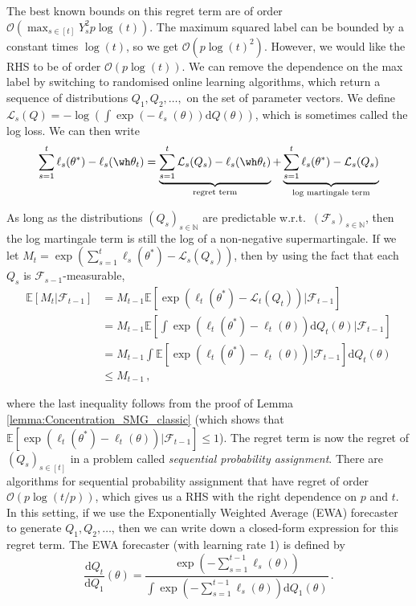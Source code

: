 The best known bounds on this regret term are of order $\mathcal{O}(\max_{s \in [t]}Y_s^2 p\log(t))$. The maximum squared label can be bounded by a constant times $\log(t)$, so we get $\mathcal{O}(p\log(t)^2)$. However, we would like the RHS to be of order $\mathcal{O}(p\log(t))$. We can remove the dependence on the max label by switching to randomised online learning algorithms, which return a sequence of distributions $Q_1, Q_2, \dots, $ on the set of parameter vectors. We define $\mathcal{L}_s(Q) = -\log(\int\exp(-\ell_s(\theta))\mathrm{d}Q(\theta))$, which is sometimes called the log loss. We can then write
\begin{equation}
\sum_{s=1}^t\ell_s(\theta^*)-\ell_s(\wh \theta_t) = \underbrace{\sum_{s=1}^t \mathcal{L}_s(Q_s)-\ell_s(\wh \theta_t) }_{\text{regret term}}  + \underbrace{\sum_{s=1}^t \ell_s(\theta^*)-\mathcal{L}_s(Q_s)}_{\text{log martingale term}}\label{eqn:randomised_reg_plus_mart}
\end{equation}

As long as the distributions $(Q_s)_{s \in \mathbb{N}}$ are predictable w.r.t.\ $(\mathcal{F}_s)_{s \in \mathbb{N}}$, then the log martingale term is still the log of a non-negative supermartingale. If we let $M_t = \exp(\sum_{s=1}^{t}\ell_s(\theta^*) - \mathcal{L}_s(Q_s))$, then by using the fact that each $Q_s$ is $\mathcal{F}_{s-1}$-measurable,
\begin{align*}
\mathbb{E}[M_t|\mathcal{F}_{t-1}] &= M_{t-1}\mathbb{E}[\exp(\ell_t(\theta^*) - \mathcal{L}_t(Q_t))|\mathcal{F}_{t-1}]\\
&= M_{t-1}\mathbb{E}\left[\int\exp(\ell_t(\theta^*) - \ell_t(\theta))\mathrm{d}Q_t(\theta)\Big|\mathcal{F}_{t-1}\right]\\
&= M_{t-1}\int\mathbb{E}[\exp(\ell_t(\theta^*) - \ell_t(\theta))|\mathcal{F}_{t-1}]\mathrm{d}Q_t(\theta)\\
&\leq M_{t-1}\,,
\end{align*}

where the last inequality follows from the proof of Lemma \ref{lemma:Concentration_SMG_classic} (which shows that $\mathbb{E}[\exp(\ell_t(\theta^*) - \ell_t(\theta))|\mathcal{F}_{t-1}] \leq 1$). The regret term is now the regret of $(Q_s)_{s \in [t]}$ in a problem called \emph{sequential probability assignment}. There are algorithms for sequential probability assignment that have regret of order $\mathcal{O}(p\log(t/p))$, which gives us a RHS with the right dependence on $p$ and $t$. In this setting, if we use the Exponentially Weighted Average (EWA) forecaster to generate $Q_1, Q_2, \dots$, then we can write down a closed-form expression for this regret term. The EWA forecaster (with learning rate 1) is defined by
\begin{equation*}
\frac{\mathrm{d}Q_t}{\mathrm{d}Q_1}(\theta) = \frac{\exp(-\sum_{s=1}^{t-1}\ell_s(\theta))}{\int \exp(-\sum_{s=1}^{t-1}\ell_s(\theta))\mathrm{d}Q_1(\theta)}\,.
\end{equation*}

